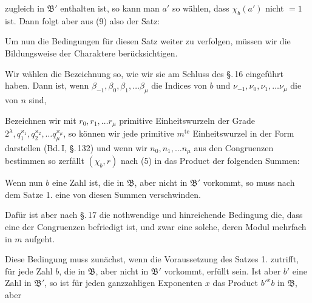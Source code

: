 zugleich in $\mathfrak{B}'$ enthalten ist, so kann man $a'$ so wählen, dass $\chi_b(a')$ nicht $= 1$ ist. Dann folgt aber aus (9)
also der Satz:


Um nun die Bedingungen für diesen Satz weiter zu verfolgen, müssen wir die Bildungsweise der Charaktere berücksichtigen.

Wir wählen die Bezeichnung so, wie wir sie am Schluss des \S.\,16 eingeführt haben. Dann ist, wenn $\beta_{-1}, \beta_0, \beta_1, \ldots \beta_\mu$ die Indices von $b$ und $\nu_{-1}, \nu_0, \nu_1, \ldots \nu_\mu$ die von $n$ sind,

Bezeichnen wir mit $r_0, r_1, \ldots r_\mu$ primitive Einheitswurzeln der Grade $2^\lambda, q_1^{\varkappa_1}, q_2^{\varkappa_2}, \ldots q_\mu^{\varkappa_\mu}$, so können wir jede primitive $m^{\text{te}}$ Einheitswurzel in der Form darstellen (Bd.\,I, \S.\,132)
und wenn wir $n_0, n_1, \ldots n_\mu$ aus den Congruenzen bestimmen
so zerfällt $(\chi_b, r)$ nach (5) in das Product der folgenden Summen:

Wenn nun $b$ eine Zahl ist, die in $\mathfrak{B}$, aber nicht in $\mathfrak{B}'$ vorkommt, so muss nach dem Satze 1. eine von diesen Summen verschwinden.

Dafür ist aber nach \S.\,17 die nothwendige und hinreichende Bedingung die, dass eine der Congruenzen
befriedigt ist, und zwar eine solche, deren Modul mehrfach in $m$ aufgeht.

Diese Bedingung muss zunächst, wenn die Voraussetzung des Satzes 1. zutrifft, für jede Zahl $b$, die in $\mathfrak{B}$, aber nicht in $\mathfrak{B}'$ vorkommt, erfüllt sein. Ist aber $b'$ eine Zahl in $\mathfrak{B}'$, so ist für jeden ganzzahligen Exponenten $x$ das Product $b'^{x} b$ in $\mathfrak{B}$, aber
